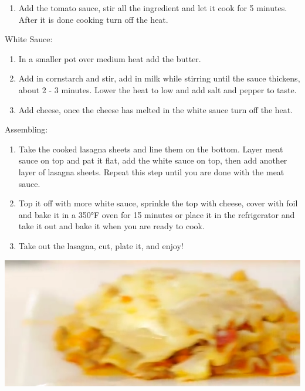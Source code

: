 \documentclass{article}
\begin{document}
\begin{multicols}{2}
\begin{enumerate}
\begin{enumerate}
\item  Add the tomato sauce, stir all the ingredient and let it cook for 5 minutes. After it is done cooking turn off the heat.

\end{enumerate}

White Sauce:
\begin{enumerate}
\item In a smaller pot over medium heat add the butter.

\item Add in cornstarch and stir, add in milk while stirring until the sauce thickens, about 2 - 3 minutes. Lower the heat to low and add salt and pepper to taste.

\item Add cheese, once the cheese has melted in the white sauce turn off the heat.
\end{enumerate}


Assembling:

\begin{enumerate}
\item Take the cooked lasagna sheets and line them on the bottom. Layer meat sauce on top and pat it flat, add the white sauce on top, then add another layer of lasagna sheets. Repeat this step until you are done with the meat sauce.

\item Top it off with more white sauce, sprinkle the top with cheese, cover with foil and bake it in a 350°F oven for 15 minutes or place it in the refrigerator and take it out and bake it when you are ready to cook.

\item Take out the lasagna, cut, plate it, and enjoy!
\end{enumerate}

\end{enumerate}
\end{multicols}



\begin{center}
\includegraphics[scale=0.4]{Lasagna.png}
\end{center}
\end{document}
